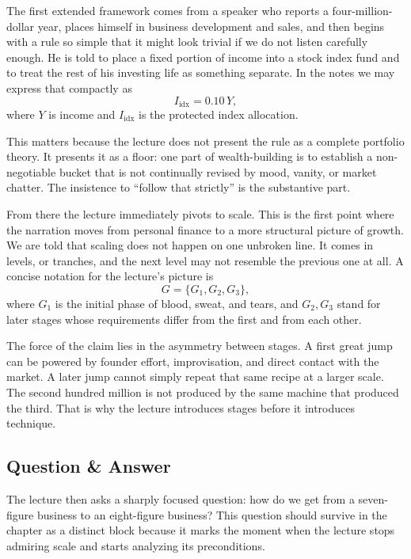 The first extended framework comes from a speaker who reports a four-million-dollar year, places himself in business development and sales, and then begins with a rule so simple that it might look trivial if we do not listen carefully enough. He is told to place a fixed portion of income into a stock index fund and to treat the rest of his investing life as something separate. In the notes we may express that compactly as
\begin{equation}
I_{\mathrm{idx}} = 0.10\,Y,
\end{equation}
where $Y$ is income and $I_{\mathrm{idx}}$ is the protected index allocation.

This matters because the lecture does not present the rule as a complete portfolio theory. It presents it as a floor: one part of wealth-building is to establish a non-negotiable bucket that is not continually revised by mood, vanity, or market chatter. The insistence to ``follow that strictly'' is the substantive part.

From there the lecture immediately pivots to scale. This is the first point where the narration moves from personal finance to a more structural picture of growth. We are told that scaling does not happen on one unbroken line. It comes in levels, or tranches, and the next level may not resemble the previous one at all. A concise notation for the lecture's picture is
\begin{equation}
G=\{G_1,G_2,G_3\},
\end{equation}
where $G_1$ is the initial phase of blood, sweat, and tears, and $G_2,G_3$ stand for later stages whose requirements differ from the first and from each other.

The force of the claim lies in the asymmetry between stages. A first great jump can be powered by founder effort, improvisation, and direct contact with the market. A later jump cannot simply repeat that same recipe at a larger scale. The second hundred million is not produced by the same machine that produced the third. That is why the lecture introduces stages before it introduces technique.

\subsection{Question \& Answer}

The lecture then asks a sharply focused question: how do we get from a seven-figure business to an eight-figure business? This question should survive in the chapter as a distinct block because it marks the moment when the lecture stops admiring scale and starts analyzing its preconditions.

